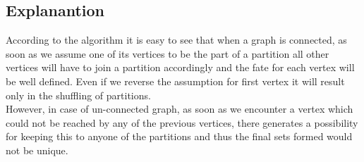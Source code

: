 \documentclass[20pt]{article}
\begin{document}
\subsection{Explanantion}
According to the algorithm it is easy to see that when a graph is connected, as soon as we assume one of its vertices to be the part of a partition all other vertices will have to join a partition accordingly and the fate for each vertex will be well defined. Even if we reverse the assumption for first vertex it will result only in the shuffling of partitions. \\
However, in case of un-connected graph, as soon as we encounter a vertex which could not be reached by any of the previous vertices, there generates a possibility for keeping this to anyone of the partitions and thus the final sets formed would not be unique.
\end{document}
